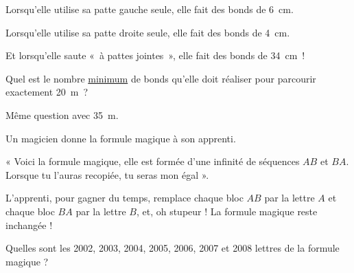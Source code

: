 \begin{enigme}

Lorsqu'elle utilise sa patte gauche seule, elle fait des bonds de 6 cm.

Lorsqu'elle utilise sa patte droite seule, elle fait des bonds de 4 cm.

Et lorsqu'elle saute « à pattes jointes », elle fait des bonds de 34 cm !

Quel est le nombre \underline{minimum} de bonds qu'elle doit réaliser pour parcourir exactement 20 m ?

Même question avec 35 m.
 
 \end{enigme}
 
 \vspace*{2em}
 

\begin{enigme}[Abracadabra]

Un magicien donne la formule magique à son apprenti.

« Voici la formule magique, elle est formée d'une infinité de séquences $AB$ et $BA$. Lorsque tu l'auras recopiée, tu seras mon égal ».

L'apprenti, pour gagner du temps, remplace chaque bloc $AB$ par la lettre $A$ et chaque bloc $BA$ par la lettre $B$, et, oh stupeur ! La formule magique reste inchangée !

Quelles sont les 2002, 2003, 2004, 2005, 2006, 2007 et 2008 lettres de la formule magique ?

\end{enigme} 
